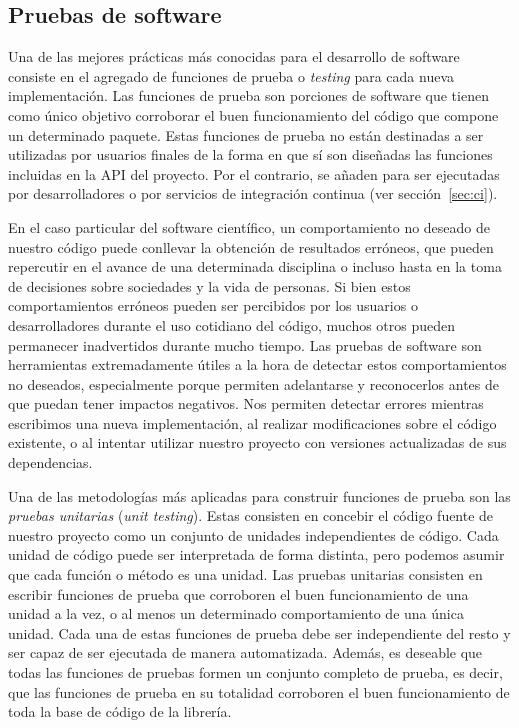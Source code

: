 \subsection{Pruebas de software}

Una de las mejores prácticas más conocidas para el desarrollo de software
consiste en el agregado de funciones de prueba o \emph{testing} para cada nueva
implementación.
Las funciones de prueba son porciones de software que tienen como único
objetivo corroborar el buen funcionamiento del código que compone un
determinado paquete.
Estas funciones de prueba no están destinadas a ser utilizadas por usuarios
finales de la forma en que sí son diseñadas las funciones incluidas en la
\ac{API} del proyecto.
Por el contrario, se añaden para ser ejecutadas por desarrolladores o por
servicios de integración continua (ver sección~\ref{sec:ci}).

En el caso particular del software científico, un comportamiento no deseado de
nuestro código puede conllevar la obtención de resultados erróneos, que pueden
repercutir en el avance de una determinada disciplina o incluso hasta en la
toma de decisiones sobre sociedades y la vida de personas.
Si bien estos comportamientos erróneos pueden ser percibidos por los usuarios
o desarrolladores durante el uso cotidiano del código, muchos otros pueden
permanecer inadvertidos durante mucho tiempo.
Las pruebas de software son herramientas extremadamente útiles a la hora de
detectar estos comportamientos no deseados, especialmente porque permiten
adelantarse y reconocerlos antes de que puedan tener impactos negativos.
Nos permiten detectar errores mientras escribimos una nueva implementación, al
realizar modificaciones sobre el código existente, o al intentar utilizar
nuestro proyecto con versiones actualizadas de sus dependencias.

Una de las metodologías más aplicadas para construir funciones de prueba son
las \emph{pruebas unitarias} (\emph{unit testing}).
Estas consisten en concebir el código fuente de nuestro proyecto como un
conjunto de unidades independientes de código.
Cada unidad de código puede ser interpretada de forma distinta, pero podemos
asumir que cada función o método es una unidad.
Las pruebas unitarias consisten en escribir funciones de prueba que corroboren
el buen funcionamiento de una unidad a la vez, o al menos un determinado
comportamiento de una única unidad.
Cada una de estas funciones de prueba debe ser independiente del resto y ser
capaz de ser ejecutada de manera automatizada.
Además, es deseable que todas las funciones de pruebas formen un conjunto
completo de prueba, es decir, que las funciones de prueba en su totalidad
corroboren el buen funcionamiento de toda la base de código de la librería.

